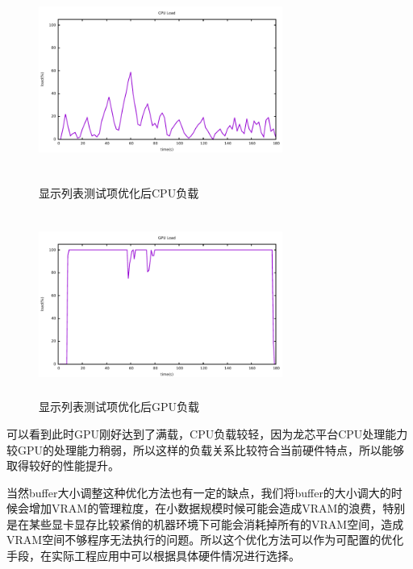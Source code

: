 \begin{figure}[H] 
  \begin{minipage}[t]{0.5\linewidth} 
  \centering
  \includegraphics[width=8cm,height=6cm]{figures/gnuplot/dsp/cpu-load-opt}
  \caption{显示列表测试项优化后CPU负载}
  \label{fig:cpu-load-dsp-opt}
  \end{minipage}
  \begin{minipage}[t]{0.5\linewidth} 
  \centering
  \includegraphics[width=8cm,height=6cm]{figures/gnuplot/dsp/gpu-load-opt}
  \caption{显示列表测试项优化后GPU负载}
  \label{fig:gpu-load-dsp-opt}
  \end{minipage}
\end{figure}

可以看到此时GPU刚好达到了满载，CPU负载较轻，因为龙芯平台CPU处理能力较GPU的处理能力稍弱，所以这样的负载关系比较符合当前硬件特点，所以能够取得较好的性能提升。

当然buffer大小调整这种优化方法也有一定的缺点，我们将buffer的大小调大的时候会增加VRAM的管理粒度，在小数据规模时候可能会造成VRAM的浪费，特别是在某些显卡显存比较紧俏的机器环境下可能会消耗掉所有的VRAM空间，造成VRAM空间不够程序无法执行的问题。所以这个优化方法可以作为可配置的优化手段，在实际工程应用中可以根据具体硬件情况进行选择。
